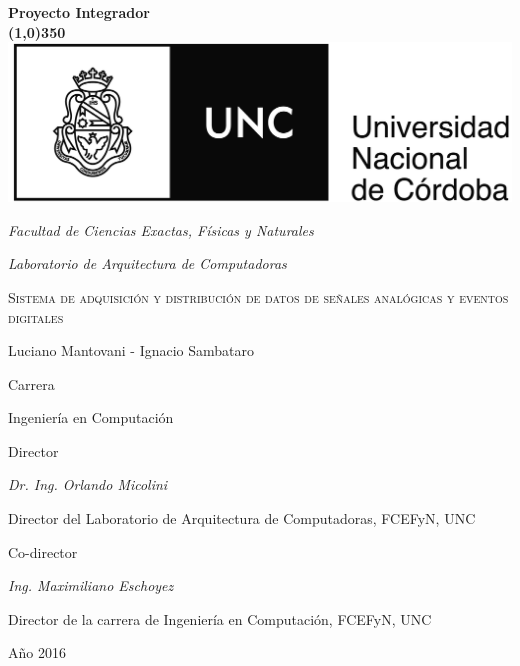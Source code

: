 \documentclass[a4paper]{report}
\date{}
\begin{document}
\begin{titlepage}
	\centering
    \textbf{\huge{Proyecto Integrador} \\ \line(1,0){350}} \\
	\vspace{0.5cm}\includegraphics[scale=0.53]{Escudo.jpg}\\
    \vspace{0.15cm}
    {\large\itshape Facultad de Ciencias Exactas, Físicas y Naturales\par}
    \vspace{0.15cm}
    {\large\itshape Laboratorio de Arquitectura de Computadoras\par}
	\vspace{1cm}
	{\scshape\Huge Sistema de adquisición y distribución de datos de señales analógicas y eventos digitales\par}
    \vspace{1cm}
    {\Large Luciano Mantovani - Ignacio Sambataro\par}
    \vspace{1.5cm}
    {\large Carrera\par}
	\vspace{0.10cm}
	{\large Ingeniería en Computación\par}
	\vspace{1cm}
    {\large Director\par}
	\vspace{0.10cm}
	{\large\itshape Dr. Ing. Orlando Micolini\par}
    {Director del Laboratorio de Arquitectura de Computadoras, FCEFyN, UNC\par}
	\vspace{1cm}
    {\large Co-director\par}
	\vspace{0.10cm}
	{\large\itshape Ing. Maximiliano Eschoyez\par}
    {Director de la carrera de Ingeniería en Computación, FCEFyN, UNC\par}

	\vfill

	{\large Año 2016 \par}
\end{titlepage}
\end{document}
